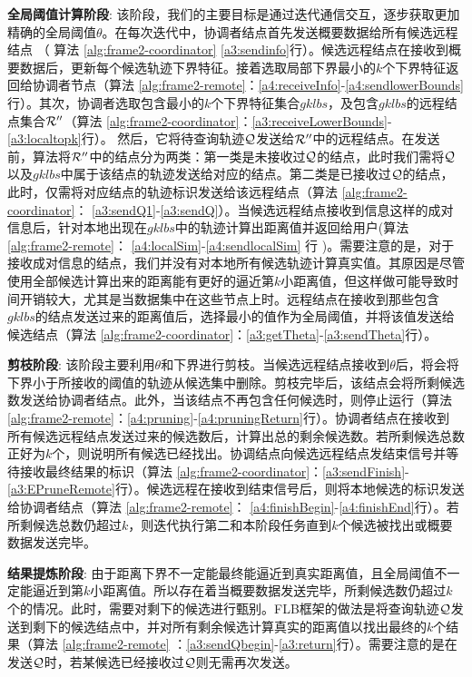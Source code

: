 \textbf{全局阈值计算阶段}: 该阶段，我们的主要目标是通过迭代通信交互，逐步获取更加精确的全局阈值$\theta$。在每次迭代中，协调者结点首先发送概要数据给所有候选远程结点
（ 算法 \ref{alg:frame2-coordinator} \ref{a3:sendinfo}行）。候选远程结点在接收到概要数据后，更新每个候选轨迹下界特征。接着选取局部下界最小的$k$个下界特征返回给协调者节点（算法 \ref{alg:frame2-remote}：\ref{a4:receiveInfo}-\ref{a4:sendlowerBounds}行）。其次，协调者选取包含最小的$k$个下界特征集合$gklbs$，及包含$gklbs$的远程结点集合${\cal R}''$（算法 \ref{alg:frame2-coordinator}：\ref{a3:receiveLowerBounds}-\ref{a3:localtopk}行）。
然后，它将待查询轨迹$\cal Q$发送给${\cal R}''$中的远程结点。在发送前，算法将${\cal R}''$中的结点分为两类：第一类是未接收过$\cal Q$的结点，此时我们需将$\cal Q$ 以及$gklbs$中属于该结点的轨迹发送给对应的结点。第二类是已接收过$\cal Q$的结点，此时，仅需将对应结点的轨迹标识发送给该远程结点（算法 \ref{alg:frame2-coordinator}：
\ref{a3:sendQ1}-\ref{a3:sendQ}）。当候选远程结点接收到信息这样的成对信息后，针对本地出现在$gklbs$中的轨迹计算出距离值并返回给用户(算法 \ref{alg:frame2-remote}： \ref{a4:localSim}-\ref{a4:sendlocalSim} 行 )。需要注意的是，对于接收成对信息的结点，我们并没有对本地所有候选轨迹计算真实值。其原因是尽管使用全部候选计算出来的距离能有更好的逼近第$k$小距离值，但这样做可能导致时间开销较大，尤其是当数据集中在这些节点上时。远程结点在接收到那些包含$gklbs$的结点发送过来的距离值后，选择最小的值作为全局阈值，并将该值发送给候选结点（算法 \ref{alg:frame2-coordinator}：\ref{a3:getTheta}-\ref{a3:sendTheta}行）。



\textbf{剪枝阶段}: 该阶段主要利用$\theta$和下界进行剪枝。当候选远程结点接收到$\theta$后，将会将下界小于所接收的阈值的轨迹从候选集中删除。剪枝完毕后，该结点会将所剩候选数发送给协调者结点。此外，当该结点不再包含任何候选时，则停止运行（算法 \ref{alg:frame2-remote}：\ref{a4:pruning}-\ref{a4:pruningReturn}行）。协调者结点在接收到
所有候选远程结点发送过来的候选数后，计算出总的剩余候选数。若所剩候选总数正好为$k$个，则说明所有候选已经找出。协调结点向候选远程结点发结束信号并等待接收最终结果的标识（算法 \ref{alg:frame2-coordinator}：\ref{a3:sendFinish}-\ref{a3:EPruneRemote}行）。候选远程在接收到结束信号后，则将本地候选的标识发送给协调者结点（算法 \ref{alg:frame2-remote}： \ref{a4:finishBegin}-\ref{a4:finishEnd}行）。若所剩候选总数仍超过$k$，则迭代执行第二和本阶段任务直到$k$个候选被找出或概要数据发送完毕。


\textbf{结果提炼阶段}: 由于距离下界不一定能最终能逼近到真实距离值，且全局阈值不一定能逼近到第$k$小距离值。所以存在着当概要数据发送完毕，所剩候选数仍超过$k$个的情况。此时，需要对剩下的候选进行甄别。FLB框架的做法是将查询轨迹$\cal Q$发送到剩下的候选结点中，并对所有剩余候选计算真实的距离值以找出最终的$k$个结果（算法 \ref{alg:frame2-remote} ：\ref{a3:sendQbegin}-\ref{a3:return}行）。需要注意的是在发送$\cal Q$时，若某候选已经接收过$\cal Q$则无需再次发送。




